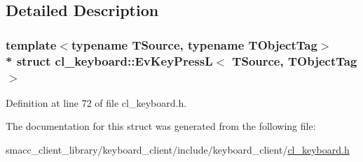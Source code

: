 \subsection{Detailed Description}
\subsubsection*{template$<$typename T\+Source, typename T\+Object\+Tag$>$\\*
struct cl\+\_\+keyboard\+::\+Ev\+Key\+Press\+L$<$ T\+Source, T\+Object\+Tag $>$}



Definition at line 72 of file cl\+\_\+keyboard.\+h.



The documentation for this struct was generated from the following file\+:\begin{DoxyCompactItemize}
\item 
smacc\+\_\+client\+\_\+library/keyboard\+\_\+client/include/keyboard\+\_\+client/\hyperlink{cl__keyboard_8h}{cl\+\_\+keyboard.\+h}\end{DoxyCompactItemize}
